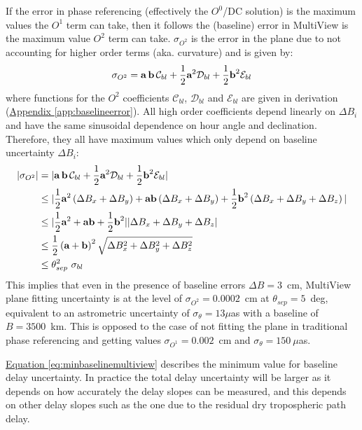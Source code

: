 		If the error in phase referencing (effectively the $O^0$/DC solution) is the maximum values the $O^1$ term can take, then it follows the (baseline) error in MultiView is the maximum value $O^2$ term can take. $\sigma_{O^2}$ is the error in the plane due to not accounting for higher order terms (aka. curvature) and is given by:
		\begin{equation}
		\sigma_{O^2} =  \textbf{a\,b}\,\mathcal{C}_{bl} + \frac{1}{2}\textbf{a}^2\mathcal{D}_{bl} + \frac{1}{2}\textbf{b}^2\mathcal{E}_{bl} 
		\end{equation} where functions for the $O^2$ coefficients $\mathcal{C}_{bl}$, $\mathcal{D}_{bl}$ and $\mathcal{E}_{bl}$ are given in derivation (\hyperref[app:baselineerror]{Appendix \ref*{app:baselineerror}}). All high order coefficients depend linearly on $\Delta B_i$ and have the same sinusoidal dependence on hour angle and declination. Therefore, they all have maximum values which only depend on baseline uncertainty $\Delta B_i$:
		\begin{equation}
			\begin{split}
				|\sigma_{O^2}| &= | \textbf{a\,b}\,\mathcal{C}_{bl} + \frac{1}{2}\textbf{a}^2\mathcal{D}_{bl} + \frac{1}{2}\textbf{b}^2\mathcal{E}_{bl} | \\
							 &\le|\frac{1}{2}\textbf{a}^2\left(\Delta B_x+\Delta B_y\right)+\textbf{a}\textbf{b}\left(\Delta B_x+\Delta B_y\right)+\frac{1}{2}\textbf{b}^2\left(\Delta B_x+\Delta B_y+\Delta B_z\right)|\\
							 &\le|\frac{1}{2}\textbf{a}^2+\textbf{a}\textbf{b}+\frac{1}{2}\textbf{b}^2||\Delta B_x + \Delta B_y + \Delta B_z|\\
							 &\le \frac{1}{2}\left(\textbf{a}+\textbf{b}\right)^2\sqrt{\Delta B_x^2 + \Delta B_y^2 + \Delta B_z^2} \\
							 &\le \theta_{sep}^2~\sigma_{bl}
			\end{split}
			\label{eq:minbaselinemultiview}
		\end{equation} This implies that even in the presence of baseline errors $\Delta B = 3$~cm, MultiView plane fitting uncertainty is at the level of $\sigma_{O^2}=0.0002$~cm at $\theta_{sep}=5$~deg, equivalent to an astrometric uncertainty of $\sigma_\theta=13\mu$as with a baseline of $B=3500$~km. This is opposed to the case of not fitting the plane in traditional phase referencing and getting values $\sigma_{O^1}=0.002$~cm and $\sigma_\theta=150~\mu$as. 
		
		\hyperref[eq:minbaselinemultiview]{Equation \ref*{eq:minbaselinemultiview}} describes the minimum value for baseline delay uncertainty. In practice the total delay uncertainty will be larger as it depends on how accurately the delay slopes can be measured, and this depends on other delay slopes such as the one due to the residual dry tropospheric path delay.
	
